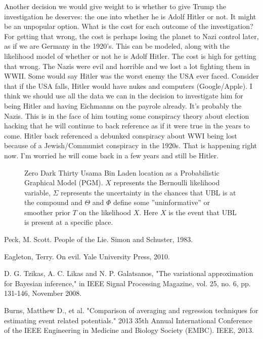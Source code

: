 \documentclass{article}
\begin{document}
\begin{multicols}{2}
Another decision we would give weight to is whether to give Trump the investigation he deserves: the one into whether he is Adolf Hitler or not. It might be an unpopular option. What is the cost for each outcome of the investigation? For getting that wrong, the cost is perhaps losing the planet to Nazi control later, as if we are Germany in the 1920's. This can be modeled, along with the likelihood model of whether or not he is Adolf Hitler. The cost is high for getting that wrong. The Nazis were evil and horrible and we lost a lot fighting them in WWII. Some would say Hitler was the worst enemy the USA ever faced. Consider that if the USA falls, Hitler would have nukes and computers (Google/Apple). I think we should use all the data we can in the decision to investigate him for being Hitler and having Eichmanns on the payrole already. It's probably the Nazis. This is in the face of him touting some conspiracy theory about election hacking that he will continue to back reference as if it were true in the years to come. Hitler back referenced a debunked conspiracy about WWI being lost because of a Jewish/Communist conspiracy in the 1920s. That is happening right now. I'm worried he will come back in a few years and still be Hitler.

\closearticle

\end{multicols}

\begin{figure}

  
  
  \caption{Zero Dark Thirty Usama Bin Laden location as a Probabilistic Graphical Model (PGM). $X$ represents the Bernoulli likelihood variable, $\Sigma$ represents the uncertainty in the chances that UBL is at the compound and $\Theta$ and $\Phi$ define some ''uninformative'' or smoother prior $T$ on the likelihood $X$. Here $X$ is the event that UBL is present at a specific place.}
  
\end{figure}

\begin{thebibliography}{9}

Peck, M. Scott. People of the Lie. Simon and Schuster, 1983.

Eagleton, Terry. On evil. Yale University Press, 2010.

D. G. Tzikas, A. C. Likas and N. P. Galatsanos, "The variational approximation for Bayesian inference," in IEEE Signal Processing Magazine, vol. 25, no. 6, pp. 131-146, November 2008.

Burns, Matthew D., et al. "Comparison of averaging and regression techniques for estimating event related potentials." 2013 35th Annual International Conference of the IEEE Engineering in Medicine and Biology Society (EMBC). IEEE, 2013.

\end{thebibliography}
\end{document}
